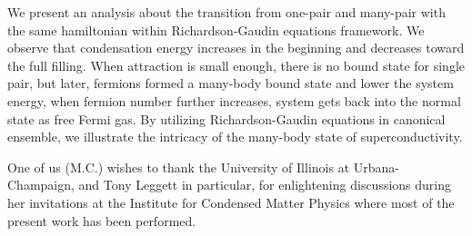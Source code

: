 \documentclass[aps,prb,showpacs,reprint]{revtex4-1}
\begin{document}
We present an analysis about the transition from one-pair and many-pair with the same hamiltonian within Richardson-Gaudin equations framework.  We observe that condensation energy increases in the beginning and decreases toward the full filling. When attraction is small enough, there is no bound state for single pair, but later, fermions formed a many-body bound state and lower the system energy, when fermion number further increases, system gets back into the normal state as free Fermi gas.  By utilizing Richardson-Gaudin equations in canonical ensemble, we illustrate the intricacy of the many-body state of superconductivity.  

One of us (M.C.) wishes to thank the University of Illinois at
Urbana-Champaign, and Tony Leggett in particular, for enlightening discussions during her invitations at
the Institute for Condensed Matter Physics where most of the present work has been
performed. 

%


\end{document}
